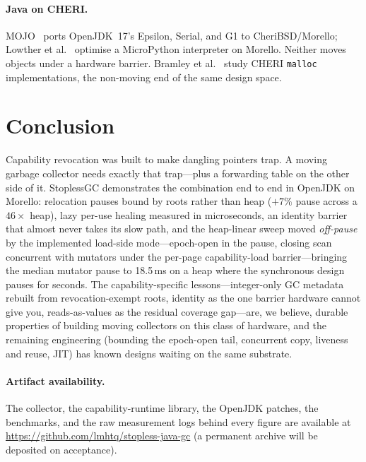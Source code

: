 \documentclass[acmsmall,nonacm,screen]{acmart}
\begin{document}
\paragraph{Java on CHERI.} MOJO~\cite{mojo-jvm} ports OpenJDK~17's
Epsilon, Serial, and G1 to CheriBSD/Morello; Lowther et
al.~\cite{cheri-interpreter} optimise a MicroPython interpreter on
Morello. Neither moves objects under a hardware barrier.
Bramley et al.~\cite{cheri-allocators} study CHERI
\texttt{malloc} implementations, the non-moving end of the same design
space.

\section{Conclusion}
\label{sec:conc}

Capability revocation was built to make dangling pointers trap. A
moving garbage collector needs exactly that trap---plus a forwarding
table on the other side of it. StoplessGC demonstrates the
combination end to end in OpenJDK on Morello: relocation pauses bound
by roots rather than heap ($+7\%$ pause across a $46\times$ heap),
lazy per-use healing measured in microseconds, an identity barrier
that almost never takes its slow path, and the heap-linear sweep moved \emph{off-pause} by the implemented
load-side mode---epoch-open in the pause, closing scan concurrent with
mutators under the per-page capability-load barrier---bringing the
median mutator pause to 18.5\,ms on a heap where the synchronous
design pauses for seconds. The capability-specific lessons---integer-only GC
metadata rebuilt from revocation-exempt roots, identity as the one
barrier hardware cannot give you, reads-as-values as the residual
coverage gap---are, we believe, durable properties of building moving
collectors on this class of hardware, and the remaining engineering (bounding the epoch-open tail,
concurrent copy, liveness and reuse, JIT) has known designs waiting on
the same substrate.

\paragraph{Artifact availability.} The collector, the
capability-runtime library, the OpenJDK patches, the benchmarks, and
the raw measurement logs behind every figure are available at
\url{https://github.com/lmhtq/stopless-java-gc} (a permanent archive
will be deposited on acceptance).
\end{document}
